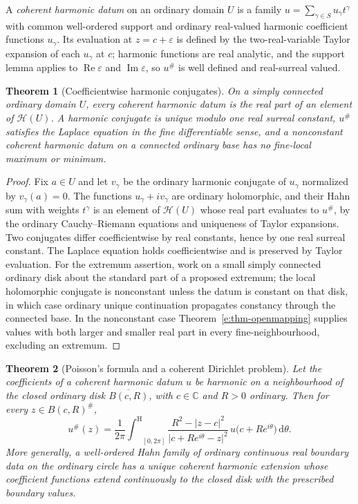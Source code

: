 \documentclass[11pt,a4paper]{article}
\numberwithin{equation}{section}
\newtheorem{theorem}{Theorem}[section]
\theoremstyle{definition}
\theoremstyle{remark}
\theoremstyle{plain}
\newcommand{\CC}{\mathbb C}
\newcommand{\tm}{t}
\newcommand{\halo}[1]{#1^{\#}}
\newcommand{\ev}[1]{#1^{\#}}
\newcommand{\Hc}{\mathcal H}
\newcommand{\intH}{{\int^{\mathrm H}}}
\newcommand{\abs}[1]{\lvert #1\rvert}
\newcommand{\dd}{\mathrm d}
\begin{document}
A \emph{coherent harmonic datum} on an ordinary domain $U$ is a family
$u=\sum_{\gamma\in S}u_\gamma\tm^\gamma$ with common well-ordered support
and ordinary real-valued harmonic coefficient functions $u_\gamma$.  Its
evaluation at $z=c+\varepsilon$ is defined by the two-real-variable Taylor
expansion of each $u_\gamma$ at $c$; harmonic functions are real analytic,
and the support lemma applies to $\operatorname{Re}\varepsilon$ and
$\operatorname{Im}\varepsilon$, so $\ev u$ is well defined and
real-surreal valued.

\begin{theorem}[Coefficientwise harmonic conjugates]\label{e:thm-harmonic}
On a simply connected ordinary domain $U$, every coherent harmonic datum
is the real part of an element of $\Hc(U)$.  A harmonic conjugate is
unique modulo one real surreal constant, $\ev u$ satisfies the Laplace
equation in the fine differentiable sense, and a nonconstant coherent
harmonic datum on a connected ordinary base has no fine-local maximum or
minimum.
\end{theorem}

\begin{proof}
Fix $a\in U$ and let $v_\gamma$ be the ordinary harmonic conjugate of
$u_\gamma$ normalized by $v_\gamma(a)=0$.  The functions $u_\gamma+iv_\gamma$
are ordinary holomorphic, and their Hahn sum with weights $\tm^\gamma$ is
an element of $\Hc(U)$ whose real part evaluates to $\ev u$, by the
ordinary Cauchy--Riemann equations and uniqueness of Taylor expansions.
Two conjugates differ coefficientwise by real constants, hence by one real
surreal constant.  The Laplace equation holds coefficientwise and is
preserved by Taylor evaluation.  For the extremum assertion, work on a
small simply connected ordinary disk about the standard part of a proposed
extremum; the local holomorphic conjugate is nonconstant unless the datum
is constant on that disk, in which case ordinary unique continuation
propagates constancy through the connected base.  In the nonconstant case
Theorem~\ref{e:thm-openmapping} supplies values with both larger and
smaller real part in every fine-neighbourhood, excluding an extremum.
\end{proof}

\begin{theorem}[Poisson's formula and a coherent Dirichlet problem]
\label{e:thm-poisson}
Let the coefficients of a coherent harmonic datum $u$ be harmonic on a
neighbourhood of the closed ordinary disk $\overline{B(c,R)}$, with $c\in\CC$
and $R>0$ ordinary.  Then for every $z\in\halo{B(c,R)}$,
\begin{equation}\label{e:eq-poisson}
 \ev u(z)=\frac1{2\pi}\intH_{[0,2\pi]}
 \frac{R^{2}-\abs{z-c}^{2}}{\abs{c+Re^{i\theta}-z}^{2}}\,
 u\bigl(c+Re^{i\theta}\bigr)\,\dd\theta .
\end{equation}
More generally, a well-ordered Hahn family of ordinary continuous real
boundary data on the ordinary circle has a unique coherent harmonic
extension whose coefficient functions extend continuously to the closed
disk with the prescribed boundary values.
\end{theorem}
\end{document}
